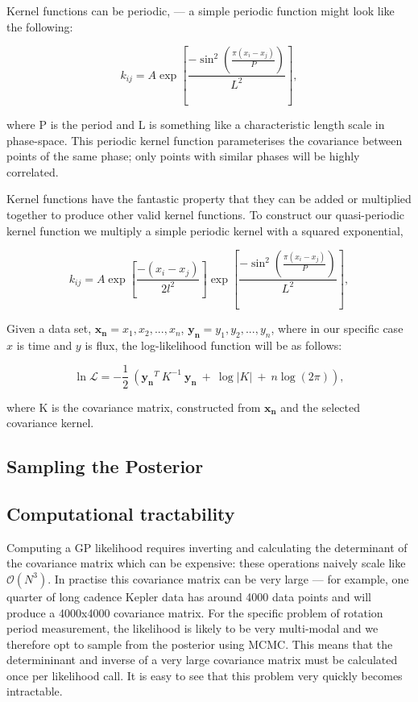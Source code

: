 \documentclass[12pt,preprint]{aastex}
\begin{document}
Kernel functions can be periodic,  --- a simple periodic function might look like the following:

\begin{equation}
	k_{ij} = A\exp\left[{\frac{-\sin^2\left({\frac{\pi(x_i-x_j)}{P}}\right)}{L^2}}\right],
\end{equation}

where P is the period and L is something like a characteristic length scale in phase-space.
This periodic kernel function parameterises the covariance between points of the same phase; only points with similar phases will be highly correlated.

Kernel functions have the fantastic property that they can be added or multiplied together to produce other valid kernel functions.
To construct our quasi-periodic kernel function we multiply a simple periodic kernel with a squared exponential,

\begin{equation}
	k_{ij} = A\exp\left[{\frac{-(x_i-x_j)}{2l^2}}\right]\exp\left[\frac{-\sin^2\left(\frac{\pi(x_i-x_j)}{P}\right)}{L^2}\right],
\end{equation}

Given a data set, $\mathbf{x_n} = {x_1, x_2, ..., x_n}$, $\mathbf{y_n} = {y_1, y_2, ..., y_n}$, where in our specific case $x$ is time and $y$ is flux, the log-likelihood function will be as follows:

\begin{equation}
	\ln{\mathcal{L}} = -\frac{1}{2}~\left(\mathbf{y_n}^T~K^{-1}~\mathbf{y_n}~ + ~\log{|K| ~+~ n\log(2\pi)} \right),
\end{equation}

where K is the covariance matrix, constructed from $\mathbf{x_n}$ and the selected covariance kernel.

\subsection{Sampling the Posterior}

\subsection{Computational tractability}

Computing a GP likelihood requires inverting and calculating the determinant of the covariance matrix which can be expensive:
these operations naively scale like $\mathcal{O}(N^3)$.
In practise this covariance matrix can be very large --- for example, one quarter of long cadence Kepler data has around 4000 data points and will produce a 4000x4000 covariance matrix.
For the specific problem of rotation period measurement, the likelihood is likely to be very multi-modal and we therefore opt to sample from the posterior using MCMC.
This means that the determininant and inverse of a very large covariance matrix must be calculated once per likelihood call.
It is easy to see that this problem very quickly becomes intractable.
\end{document}
